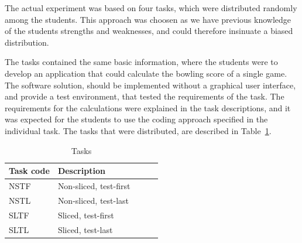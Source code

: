 \documentclass{sig-alternate-05-2015}
\begin{document}
The actual experiment was based on four tasks, which were distributed randomly among the students. This approach was choosen as we have previous knowledge of the students strengths and weaknesses, and could therefore insinuate a biased distribution.

The tasks contained the same basic information, where the students were to develop an application that could calculate the bow\-ling score of a single game. The software solution, should be implemented without a graphical user interface, and provide a test environment, that tested the requirements of the task. The requirements for the calculations were explained in the task descriptions, and it was expected for the students to use the coding approach specified in the individual task.
The tasks that were distributed, are described in Table~\ref{TaskTable}.

\begin{table}[!ht]
\centering
\caption{Tasks}
\label{TaskTable}
\begin{tabular}{|l|p{0.68\linewidth}|}
\hline
\textbf{Task code} & \textbf{Description} \\
\hline
\hline
NSTF & Non-sliced, test-first \\
NSTL & Non-sliced, test-last \\
SLTF & Sliced, test-first\\
SLTL & Sliced, test-last \\
\hline
\end{tabular}
\end{table}
\end{document}
